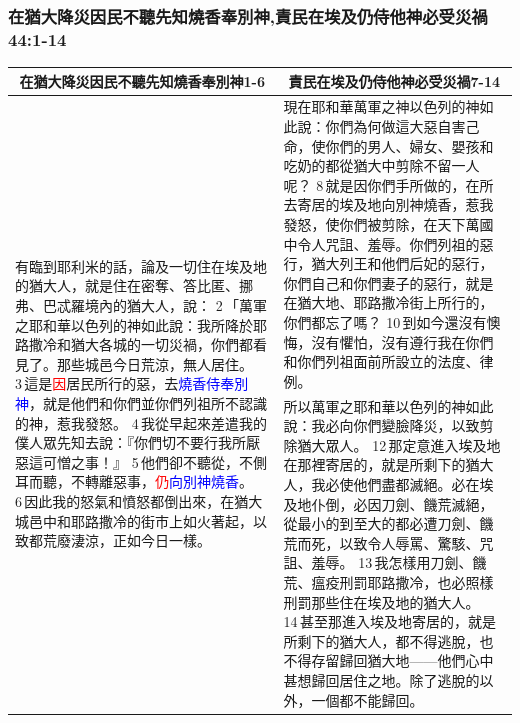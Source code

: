 \subsubsection{在猶大降災因民不聽先知燒香奉別神,責民在埃及仍侍他神必受災禍 44:1-14}
\begin{table}[H]
\centering
\begin{tabular}{p{6cm}|p{11.250cm}}\hline\hline
\multicolumn{1}{c|}{在猶大降災因民不聽先知燒香奉別神1-6}&\multicolumn{1}{c}{責民在埃及仍侍他神必受災禍7-14}\\\hline
\multirow{2}{6.26cm}{有臨到耶利米的話，論及一切住在埃及地的猶大人，就是住在密奪、答比匿、挪弗、巴忒羅境內的猶大人，說： 2 「萬軍之耶和華以色列的神如此說：我所降於耶路撒冷和猶大各城的一切災禍，你們都看見了。那些城邑今日荒涼，無人居住。 3 這是\textcolor{red}{因}居民所行的惡，去\textcolor{blue}{燒香侍奉別神}，就是他們和你們並你們列祖所不認識的神，惹我發怒。 4 我從早起來差遣我的僕人眾先知去說：『你們切不要行我所厭惡這可憎之事！』 5 他們卻不聽從，不側耳而聽，不轉離惡事，\textcolor{red}{仍}\textcolor{blue}{向別神燒香}。 6 因此我的怒氣和憤怒都倒出來，在猶大城邑中和耶路撒冷的街市上如火著起，以致都荒廢淒涼，正如今日一樣。}
&現在耶和華萬軍之神以色列的神如此說：你們為何做這大惡自害己命，使你們的男人、婦女、嬰孩和吃奶的都從猶大中剪除不留一人呢？ 8 就是因你們手所做的，在所去寄居的埃及地向別神燒香，惹我發怒，使你們被剪除，在天下萬國中令人咒詛、羞辱。你們列祖的惡行，猶大列王和他們后妃的惡行，你們自己和你們妻子的惡行，就是在猶大地、耶路撒冷街上所行的，你們都忘了嗎？ 10 到如今還沒有懊悔，沒有懼怕，沒有遵行我在你們和你們列祖面前所設立的法度、律例。\\\cline{2-2}
&所以萬軍之耶和華以色列的神如此說：我必向你們變臉降災，以致剪除猶大眾人。 12 那定意進入埃及地在那裡寄居的，就是所剩下的猶大人，我必使他們盡都滅絕。必在埃及地仆倒，必因刀劍、饑荒滅絕，從最小的到至大的都必遭刀劍、饑荒而死，以致令人辱罵、驚駭、咒詛、羞辱。 13 我怎樣用刀劍、饑荒、瘟疫刑罰耶路撒冷，也必照樣刑罰那些住在埃及地的猶大人。 14 甚至那進入埃及地寄居的，就是所剩下的猶大人，都不得逃脫，也不得存留歸回猶大地——他們心中甚想歸回居住之地。除了逃脫的以外，一個都不能歸回。\\\hline
\end{tabular}
\end{table}





